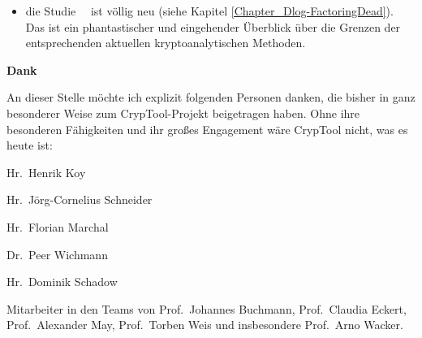 \begin{itemize}
  \item die Studie ~\glqq {}\grqq~ist völlig neu
	(siehe Kapitel \ref{Chapter_Dlog-FactoringDead}). Das ist ein
	phantastischer und eingehender Überblick über die Grenzen der
	entsprechenden aktuellen kryptoanalytischen Methoden.
\end{itemize}



\newpage
\textbf{Dank}

An dieser Stelle möchte ich explizit folgenden Personen danken,
die bisher in ganz besonderer Weise zum CrypTool-Projekt
beigetragen haben.
Ohne ihre besonderen Fähigkeiten und ihr großes Engagement wäre CrypTool
nicht, was es heute ist:
\vspace{-6pt}
\begin{list}{\textbullet}{\addtolength{\itemsep}{-0.5\baselineskip}}
   \item Hr.\ Henrik Koy
   \item Hr.\ Jörg-Cornelius Schneider
   \item Hr.\ Florian Marchal
   \item Dr.\ Peer Wichmann
   \item Hr.\ Dominik Schadow
   \item Mitarbeiter in den Teams von
         Prof.\ Johannes Buchmann,
         Prof.\ Claudia Eckert,
         Prof.~Alexander May,
         Prof.~Torben Weis und insbesondere
         Prof.\ Arno Wacker.
\end{list}

